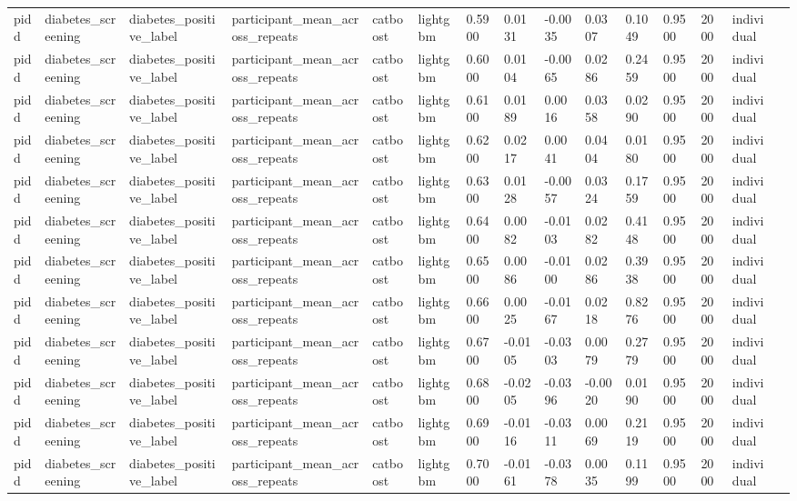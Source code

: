 \begin{tabular}{lllllllllllllll}
pidd & diabetes\_screening & diabetes\_positive\_label & participant\_mean\_across\_repeats & catboost & lightgbm & 0.5900 & 0.0131 & -0.0035 & 0.0307 & 0.1049 & 0.9500 & 2000 & individual &  \\
pidd & diabetes\_screening & diabetes\_positive\_label & participant\_mean\_across\_repeats & catboost & lightgbm & 0.6000 & 0.0104 & -0.0065 & 0.0286 & 0.2459 & 0.9500 & 2000 & individual &  \\
pidd & diabetes\_screening & diabetes\_positive\_label & participant\_mean\_across\_repeats & catboost & lightgbm & 0.6100 & 0.0189 & 0.0016 & 0.0358 & 0.0290 & 0.9500 & 2000 & individual &  \\
pidd & diabetes\_screening & diabetes\_positive\_label & participant\_mean\_across\_repeats & catboost & lightgbm & 0.6200 & 0.0217 & 0.0041 & 0.0404 & 0.0180 & 0.9500 & 2000 & individual &  \\
pidd & diabetes\_screening & diabetes\_positive\_label & participant\_mean\_across\_repeats & catboost & lightgbm & 0.6300 & 0.0128 & -0.0057 & 0.0324 & 0.1759 & 0.9500 & 2000 & individual &  \\
pidd & diabetes\_screening & diabetes\_positive\_label & participant\_mean\_across\_repeats & catboost & lightgbm & 0.6400 & 0.0082 & -0.0103 & 0.0282 & 0.4148 & 0.9500 & 2000 & individual &  \\
pidd & diabetes\_screening & diabetes\_positive\_label & participant\_mean\_across\_repeats & catboost & lightgbm & 0.6500 & 0.0086 & -0.0100 & 0.0286 & 0.3938 & 0.9500 & 2000 & individual &  \\
pidd & diabetes\_screening & diabetes\_positive\_label & participant\_mean\_across\_repeats & catboost & lightgbm & 0.6600 & 0.0025 & -0.0167 & 0.0218 & 0.8276 & 0.9500 & 2000 & individual &  \\
pidd & diabetes\_screening & diabetes\_positive\_label & participant\_mean\_across\_repeats & catboost & lightgbm & 0.6700 & -0.0105 & -0.0303 & 0.0079 & 0.2779 & 0.9500 & 2000 & individual &  \\
pidd & diabetes\_screening & diabetes\_positive\_label & participant\_mean\_across\_repeats & catboost & lightgbm & 0.6800 & -0.0205 & -0.0396 & -0.0020 & 0.0190 & 0.9500 & 2000 & individual &  \\
pidd & diabetes\_screening & diabetes\_positive\_label & participant\_mean\_across\_repeats & catboost & lightgbm & 0.6900 & -0.0116 & -0.0311 & 0.0069 & 0.2119 & 0.9500 & 2000 & individual &  \\
pidd & diabetes\_screening & diabetes\_positive\_label & participant\_mean\_across\_repeats & catboost & lightgbm & 0.7000 & -0.0161 & -0.0378 & 0.0035 & 0.1199 & 0.9500 & 2000 & individual &  \\

\end{tabular}
